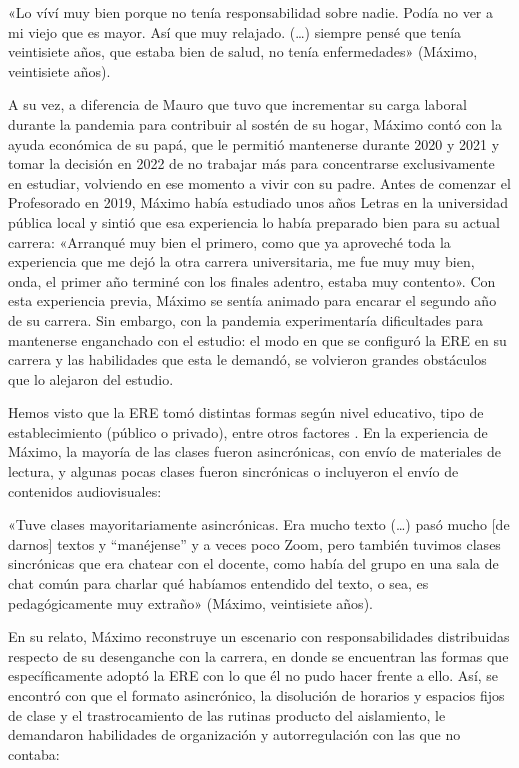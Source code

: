 \begin{refsection}
\begin{gbcita}
«Lo víví muy bien porque no tenía responsabilidad sobre nadie. Podía no ver a mi viejo que es mayor. Así que muy relajado. (…) siempre pensé que tenía veintisiete años, que estaba bien de salud, no tenía enfermedades» (Máximo, veintisiete años).

\end{gbcita}

A su vez, a diferencia de Mauro que tuvo que incrementar su carga laboral durante la pandemia para contribuir al sostén de su hogar, Máximo contó con la ayuda económica de su papá, que le permitió mantenerse durante 2020 y 2021 y tomar la decisión en 2022 de no trabajar más para concentrarse exclusivamente en estudiar, volviendo en ese momento a vivir con su padre. Antes de comenzar el Profesorado en 2019, Máximo había estudiado unos años Letras en la universidad pública local y sintió que esa experiencia lo había preparado bien para su actual carrera: «Arranqué muy bien el primero, como que ya aproveché toda la experiencia que me dejó la otra carrera universitaria, me fue muy muy bien, onda, el primer año terminé con los finales adentro, estaba muy contento». Con esta experiencia previa, Máximo se sentía animado para encarar el segundo año de su carrera. Sin embargo, con la pandemia experimentaría dificultades para mantenerse enganchado con el estudio: el modo en que se configuró la ERE en su carrera y las habilidades que esta le demandó, se volvieron grandes obstáculos que lo alejaron del estudio.

Hemos visto que la ERE tomó distintas formas según nivel educativo, tipo de establecimiento (público o privado), entre otros factores \protect\parencite{4245-LEMUS2024}. En la experiencia de Máximo, la mayoría de las clases fueron asincrónicas, con envío de materiales de lectura, y algunas pocas clases fueron sincrónicas o incluyeron el envío de contenidos audiovisuales:


\begin{gbcita}
«Tuve clases mayoritariamente asincrónicas. Era mucho texto (…) pasó mucho [de darnos] textos y “manéjense” y a veces poco Zoom, pero también tuvimos clases sincrónicas que era chatear con el docente, como había del grupo en una sala de chat común para charlar qué habíamos entendido del texto, o sea, es pedagógicamente muy extraño» (Máximo, veintisiete años).

\end{gbcita}

En su relato, Máximo reconstruye un escenario con responsabilidades distribuidas respecto de su desenganche con la carrera, en donde se encuentran las formas que específicamente adoptó la ERE con lo que él no pudo hacer frente a ello. Así, se encontró con que el formato asincrónico, la disolución de horarios y espacios fijos de clase y el trastrocamiento de las rutinas producto del aislamiento, le demandaron habilidades de organización y autorregulación con las que no contaba:



\end{refsection}
